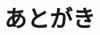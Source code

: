 \documentclass[9pt,b5paper,tombo,openany]{jsbook}
\begin{document}




\chapter{あとがき}
\end{document}
